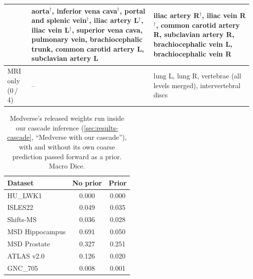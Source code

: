 \documentclass[hidelinks, a4paper, 12pt, ngerman, english]{article}  %
\begin{document}
\begin{table}[p]
\begin{tabularx}{\linewidth}{@{}p{3.2cm}XX@{}}
      & aorta$^\dagger$, inferior vena cava$^\dagger$, portal and splenic
        vein$^\dagger$, iliac artery L$^\dagger$, iliac vein L$^\dagger$,
        superior vena cava, pulmonary vein, brachiocephalic trunk, common
        carotid artery L, subclavian artery L
      & iliac artery R$^\dagger$, iliac vein R$^\dagger$, common carotid
        artery R, subclavian artery R, brachiocephalic vein L,
        brachiocephalic vein R \\
    \midrule
    MRI only (0\,/\,4)
      & --
      & lung L, lung R, vertebrae (all levels merged), intervertebral discs \\
    \bottomrule
  \end{tabularx}
\end{table}


\begin{table}[t]
  \centering
  \small
  \caption{Medverse's released weights run inside our cascade inference
  (\autoref{sec:results-cascade}, ``Medverse with our cascade''), with and
  without its own coarse prediction passed forward as a prior. Macro Dice.}
  \label{tab:medverse-prior-appendix}
  \begin{tabular}{@{}lcc@{}}
    \toprule
    Dataset & No prior & Prior \\
    \midrule
    HU\_LWK1        & 0.000 & 0.000 \\
    ISLES22         & 0.049 & 0.035 \\
    Shifts-MS       & 0.036 & 0.028 \\
    MSD Hippocampus & 0.691 & 0.050 \\
    MSD Prostate    & 0.327 & 0.251 \\
    ATLAS v2.0      & 0.126 & 0.020 \\
    GNC\_705        & 0.008 & 0.001 \\
    \bottomrule
  \end{tabular}
\end{table}
\end{document}
